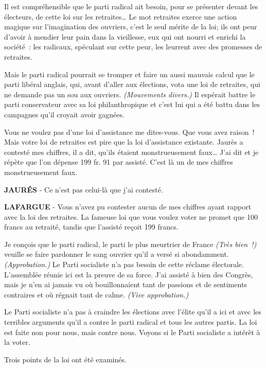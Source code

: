 \documentclass[french,twoside]{book} %
\begin{document}
Il est compréhensible que le parti radical ait besoin, pour se présenter devant les électeurs, de cette loi sur les retraites… Le mot retraites exerce une action magique sur l’imagination des ouvriers, c’est le seul mérite de la loi; ils ont peur d’avoir à mendier leur pain dans la vieillesse, eux qui ont nourri et enrichi la société : les radicaux, spéculant sur cette peur, les leurrent avec des promesses de retraites.\par
Mais le parti radical pourrait se tromper et faire un aussi mauvais calcul que le parti libéral anglais, qui, avant d’aller aux élections, vota une loi de retraites, qui ne demande pas un sou aux ouvriers. \emph{(Mouvements divers.)} Il espérait battre le parti conservateur avec sa loi philanthropique et c’est lui qui a été battu dans les campagnes qu’il croyait avoir gagnées.\par
Vous ne voulez pas d’une loi d’assistance me dites-vous. Que vous avez raison ! Mais votre loi de retraites est pire que la loi d’assistance existante. Jaurès a contesté mes chiffres, il a dit, qu’ils étaient monstrueusement faux… J'ai dit et je répète que l’on dépense 199 fr. 91 par assisté. C'est là un de mes chiffres monstrueusement faux.\par
\textbf{JAURÉS} - Ce n’est pas celui-là que j’ai contesté.\par
\textbf{LAFARGUE} - Vous n’avez pu contester aucun de mes chiffres ayant rapport avec la loi des retraites. La fameuse loi que vous voulez voter ne promet que 100 francs au retraité, tandis que l’assisté reçoit 199 francs.\par
Je conçois que le parti radical, le parti le plus meurtrier de France \emph{(Très bien !)} veuille se faire pardonner le sang ouvrier qu’il a versé si abondamment. \emph{(Approbation.)} Le Parti socialiste n’a pas besoin de cette réclame électorale. L'assemblée réunie ici est la preuve de sa force. J'ai assisté à bien des Congrès, mais je n’en ai jamais vu où bouillonnaient tant de passions et de sentiments contraires et où régnait tant de calme. \emph{(Vive approbation.)}\par
Le Parti socialiste n’a pas à craindre les élections avec l’élite qu’il a ici et avec les terribles arguments qu’il a contre le parti radical et tous les autres partis. La loi est faite non pour nous, mais contre nous. Voyons si le Parti socialiste a intérêt à la voter.\par
Trois points de la loi ont été examinés.\par
\end{document}
